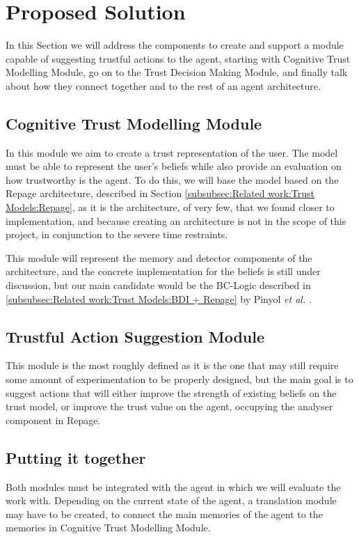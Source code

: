 \section{Proposed Solution}
\label{sec:Solution}
In this Section we will address the components to create and support a module capable of suggesting trustful actions to the agent, starting with Cognitive Trust Modelling Module, go on to the Trust Decision Making Module, and finally talk about how they connect together and to the rest of an agent architecture.


\subsection{Cognitive Trust Modelling Module}
\label{subsec:Solution:Trust Assessment Module}
In this module we aim to create a trust representation of the user. The model must be able to represent the user's beliefs while also provide an evaluation on how trustworthy is the agent. To do this, we will base the model based on the Repage architecture, described in Section \ref{subsubsec:Related work:Trust Models:Repage}, as it is the architecture, of very few, that we found closer to implementation, and because creating an architecture is not in the scope of this project, in conjunction to the severe time restraints.

This module will represent the memory and detector components of the architecture, and the concrete implementation for the beliefs is still under discussion, but our main candidate would be the BC-Logic described in \ref{subsubsec:Related work:Trust Models:BDI + Repage} by Pinyol \textit{et al.} \cite{Pinyol2009}.

\subsection{Trustful Action Suggestion Module}
\label{subsec:Solution:Trust Decision Making Module}
This module is the most roughly defined as it is the one that may still require some amount of experimentation to be properly designed, but the main goal is to suggest actions that will either improve the strength of existing beliefs on the trust model, or improve the trust value on the agent, occupying the analyser component in Repage.

\subsection{Putting it together}
Both modules must be integrated with the agent in which we will evaluate the work with. Depending on the current state of the agent, a translation module may have to be created, to connect the main memories of the agent to the memories in Cognitive Trust Modelling Module.